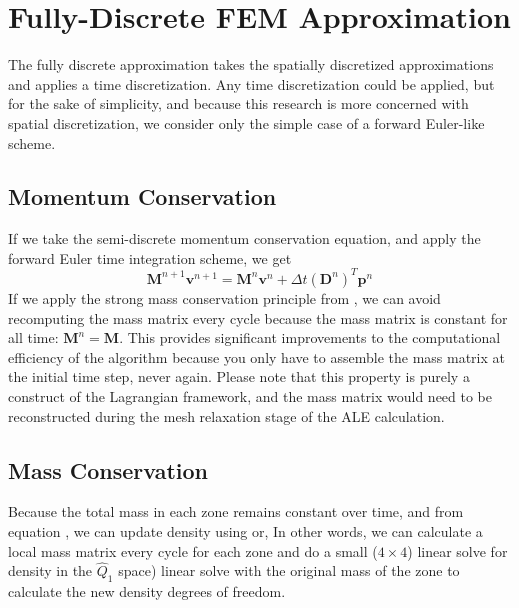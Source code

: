 \section{Fully-Discrete FEM Approximation}
The fully discrete approximation takes the spatially discretized approximations and applies a time discretization. Any time discretization could be applied, but for the sake of simplicity, and because this research is more concerned with spatial discretization, we consider only the simple case of a forward Euler-like scheme.

\subsection{Momentum Conservation}
If we take the semi-discrete momentum conservation equation,  and apply the forward Euler time integration scheme, we get
$$
\boxed{
  \mathbf{M}^{n+1} \mathbf{v}^{n+1} = \mathbf{M}^{n} \mathbf{v}^n +
   \Delta t (\mathbf{D}^n)^{T} \mathbf{p}^n
}
$$
If we apply the strong mass conservation principle from , we can avoid recomputing the mass matrix every cycle because the mass matrix is constant for all time: $\mathbf{M}^n=\mathbf{M}$. This provides significant improvements to the computational efficiency of the algorithm because you only have to assemble the mass matrix at the initial time step, never again. Please note that this property is purely a construct of the Lagrangian framework, and the mass matrix would need to be reconstructed during the mesh relaxation stage of the ALE calculation.

\subsection{Mass Conservation}
Because the total mass in each zone remains constant over time, and from equation ,
we can update density using
or,
In other words, we can calculate a local mass matrix every cycle for each zone and do a small ($4 \times 4$) linear solve for density in the $\hat Q_1$ space) linear solve with the original mass of the zone to calculate the new density degrees of freedom. 

